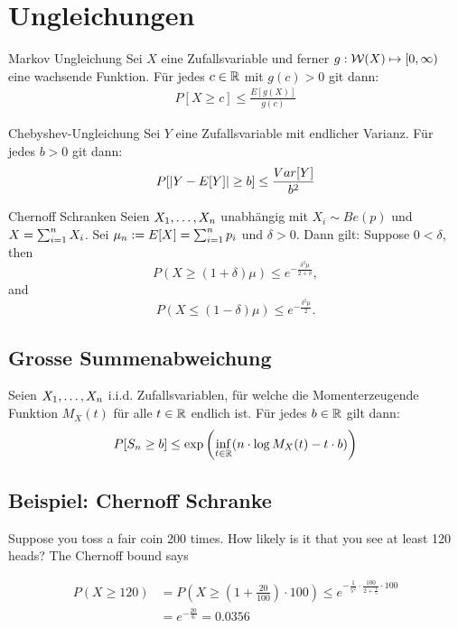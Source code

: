 \section{Ungleichungen}
\begin{definition}{Markov Ungleichung}
  Sei $X$ eine Zufallsvariable und ferner $g : \mathcal{W} (X) \mapsto [0, \infty)$ eine
wachsende Funktion. Für jedes $c \in \mathbb{R}$ mit $g (c) > 0$ git dann:
\begin{align*}
  P[X \geq c] \leq \frac{E[g (X)]}{g (c)}
\end{align*}
\end{definition}
\begin{definition}{Chebyshev-Ungleichung}
Sei $Y$ eine Zufallsvariable mit endlicher Varianz. Für jedes $b > 0$ git dann:
\begin{align*}
  P[\abs{Y - E[Y]} \geq b] \leq \frac{Var[Y]}{b^2}
\end{align*}
\end{definition}
\begin{definition}{Chernoff Schranken}
Seien $X_1, \dots, X_n$ unabhängig mit $X_i \sim Be (p)$ und $X = \sum_{i = 1}^n X_i$.
Sei $\mu_n := E[X] = \sum_{i = 1}^n p_i$ und $\delta > 0$. Dann gilt:
Suppose $0 < \delta$, then
\[ P(X \geq (1 + \delta)\mu) \leq e^{-\frac{\delta^2\mu}{2+\delta}}, \]
and
\[ P(X \leq (1 - \delta)\mu) \leq e^{-\frac{\delta^2\mu}{2}}. \]
\end{definition}

\subsection{Grosse Summenabweichung}
Seien $X_1, \dots, X_n$ i.i.d. Zufallsvariablen, für welche die
Momenterzeugende Funktion $M_X (t)$ für alle $t \in \mathbb{R}$ endlich ist. Für jedes
$b \in \mathbb{R}$ gilt dann:
\begin{align*}
  P[S_n \geq b] \leq \exp \left( \inf_{t \in \mathbb{R}}  ( n \cdot \log M_X (t) - t \cdot b ) \right)
\end{align*}


\BoxStart{}
\subsection{Beispiel: Chernoff Schranke}
Suppose you toss a fair coin 200 times. How likely is it that you see
at least 120 heads?
The Chernoff bound says

\begin{align*}
  P(X \geq 120) &= P(X \geq (1 + \frac{20}{100}) \cdot 100) \leq e^{-\frac{1}{5^2} \cdot \frac{100}{2+\frac{1}{5}} \cdot 100} \\
                &= e^{-\frac{20}{6}} = 0.0356
\end{align*}

